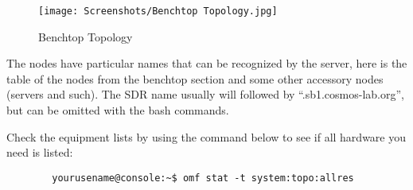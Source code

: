\documentclass{article}
\begin{document}
    \begin{figure}[ht]
        \centering
        \texttt{[image: Screenshots/Benchtop Topology.jpg]}
        \caption{Benchtop Topology}
        \vspace*{0mm}
        \label{fig: Benchtop Topology}
    \end{figure}
    
    The nodes have particular names that can be recognized by the server, here is the table of the nodes from the benchtop section and some other accessory nodes (servers and such). The SDR name usually will followed by ``.sb1.cosmos-lab.org'', but can be omitted with the bash commands. 

    Check the equipment lists by using the command below to see if all hardware you need is listed:
    \begin{verbatim}
        yourusename@console:~$ omf stat -t system:topo:allres
    \end{verbatim}
    
\end{document}

